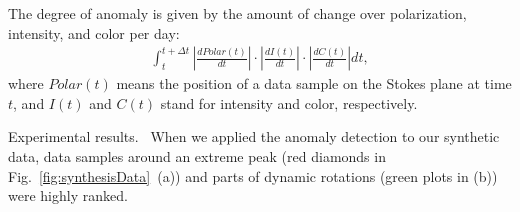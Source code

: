 The degree of anomaly is given by the amount of change over polarization, intensity, and color per day:
\begin{equation*}
\begin{split}
  \int_t^{t + \Delta t}\left|\frac{dPolar(t)}{dt}\right|\cdot\left|\frac{dI(t)}{dt}\right|\cdot\left|\frac{dC(t)}{dt}\right|dt,
  \label{eq:anomaly}
\end{split}
\end{equation*}
where $Polar(t)$ means the position of a data sample on the Stokes plane at time $t$, and $I(t)$ and $C(t)$ stand for intensity and color, respectively. 

\textsf{Experimental results.\ } When we applied the anomaly detection to our synthetic data, 
data samples around an extreme peak (red diamonds in Fig.~\ref{fig:synthesisData}~(a)) and parts of dynamic rotations (green plots in (b)) were highly ranked.


%
%
